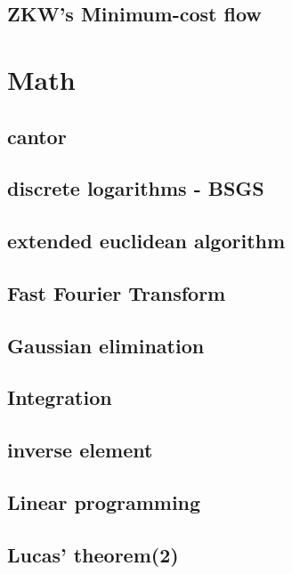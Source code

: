 \documentclass[a4paper,5pt,twocolumn,titlepage]{article}
\begin{document}
\subsection{ZKW's Minimum-cost flow}


\section{Math}
\subsection{cantor}

\subsection{discrete logarithms - BSGS}

\subsection{extended euclidean algorithm}

\subsection{Fast Fourier Transform}

\subsection{Gaussian elimination}

\subsection{Integration}

\subsection{inverse element}

\subsection{Linear programming}

\subsection{Lucas' theorem(2)}

\end{document}
